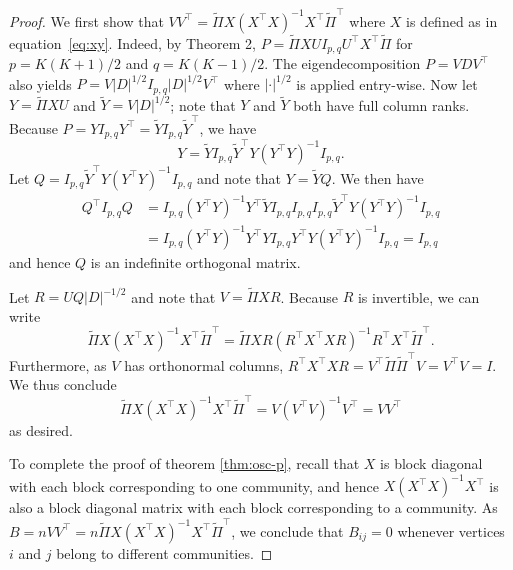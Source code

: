\documentclass[
  11pt,
]{article}
\theoremstyle{definition}
\theoremstyle{definition}
\theoremstyle{definition}
\theoremstyle{definition}
\theoremstyle{remark}
\begin{document}
\begin{proof}
We first show that $V V^\top =
\tilde{\Pi} X (X^\top X)^{-1} X^\top \tilde{\Pi}^{\top} $ where $X$ is 
defined as in equation~\eqref{eq:xy}. Indeed, by Theorem 2, 
\(P = \tilde{\Pi} X U I_{p, q} U^\top X^\top \tilde{\Pi}\) for $p = K(K+1)/2$ and $q = K(K-1)/2$. 
The eigendecomposition \(P = V D V^\top\) also yields $P = V
|D|^{1/2} I_{p, q} |D|^{1/2} V^\top$ where \(|\cdot|^{1/2}\) is
applied entry-wise. Now let $Y = \tilde{\Pi} XU$ and $\tilde{Y} = V|D|^{1/2}$; note that
$Y$ and $\tilde{Y}$ both have full column ranks. 
Because $P = Y I_{p,q} Y^{\top} = \tilde{Y} I_{p,q} \tilde{Y}^{\top}$, we have
$$Y = \tilde{Y} I_{p,q} \tilde{Y}^{\top} Y (Y^{\top} Y)^{-1} I_{p,q}.$$
Let $Q = I_{p,q} \tilde{Y}^{\top} Y (Y^{\top} Y)^{-1} I_{p,q}$ and note that
$Y = \tilde{Y} Q$. We then have
\begin{equation*}
\begin{split}
Q^{\top} I_{p,q} Q &= I_{p,q} (Y^{\top} Y)^{-1} Y^{\top} \tilde{Y} I_{p,q}
I_{p,q} I_{p,q} \tilde{Y}^{\top} Y (Y^{\top} Y)^{-1} I_{p,q} \\ 
&= I_{p,q} (Y^{\top} Y)^{-1} Y^{\top} Y I_{p,q}
Y^{\top} Y (Y^{\top} Y)^{-1} I_{p,q} =  I_{p,q}
\end{split}
\end{equation*}
and hence $Q$ is an indefinite orthogonal matrix. 

Let $R = U Q |D|^{-1/2}$ and note that $V = \tilde{\Pi} XR$. Because $R$ is
invertible, we can write
$$\tilde{\Pi} X (X^{\top} X)^{-1} X^{\top} \tilde{\Pi}^{\top} =
\tilde{\Pi} X R (R^{\top} X^{\top} X R)^{-1}
R^{\top} X^{\top} \tilde{\Pi}^{\top}.$$ 
Furthermore, as $V$ has orthonormal columns, $R^{\top} X^{\top} X R =
V^{\top} \tilde{\Pi} \tilde{\Pi}^{\top} V = V^{\top} V = I$. We thus conclude
$$\tilde{\Pi} X (X^{\top} X)^{-1} X^{\top} \tilde{\Pi}^{\top} = V (V^{\top} V)^{-1} V^{\top} = V V^{\top}$$
as desired.

To complete the proof of theorem \ref{thm:osc-p}, recall that \(X\) 
is block diagonal with each block corresponding to one community, 
and hence \(X (X^\top X)^{-1} X^\top\) is also a
block diagonal matrix with each block corresponding to a community. 
As $B = n VV^{\top} = n \tilde{\Pi} X (X^\top X)^{-1} X^\top \tilde{\Pi}^{\top}$, 
we conclude that $B_{ij} = 0$ 
whenever vertices $i$ and $j$ belong to different communities.  
\end{proof}
\end{document}
